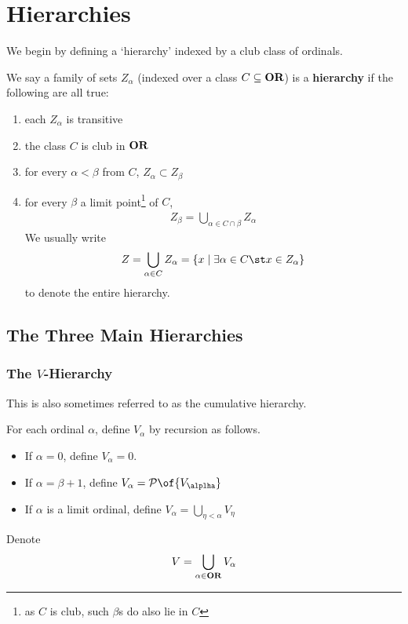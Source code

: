 \chapter{Hierarchies}

We begin by defining a `hierarchy' indexed by a club class of ordinals.

\begin{definition}[Hierarchy]
  We say a family of sets $Z_{\alpha}$ (indexed over a class $C \subseteq \mathbf{OR}$) is a \textbf{hierarchy} if the following are all true:
  \begin{enumerate}
    \item each $Z_{\alpha}$ is transitive
    \item the class $C$ is club in $\mathbf{OR}$
    \item for every $\alpha < \beta$ from $C$, $Z_{\alpha} \subset Z_{\beta}$
      \item for every $\beta$ a limit point\footnote{as $C$ is club, such $\beta$s do also lie in $C$} of $C$,
      \begin{align*}
          Z_{\beta} = \bigcup_{\alpha \in C \cap \beta} Z_{\alpha}
      \end{align*}
    We usually write
    \begin{align*}
        Z = \bigcup_{\alpha \in C} Z_{\alpha}
        = \setst{x}{\exists \alpha \in C \st x \in Z_{\alpha}}
    \end{align*}
    to denote the entire hierarchy.
  \end{enumerate}
\end{definition}

\section{The Three Main Hierarchies}

\subsection{The $V$-Hierarchy}

This is also sometimes referred to as the cumulative hierarchy.

\begin{definition}
  For each ordinal $\alpha$, define $V_{\alpha}$ by recursion as follows.
  \begin{itemize}
    \item If $\alpha = 0$, define $V_{\alpha} = 0$.
    \item If $\alpha = \beta + 1$, define $V_{\alpha} = \Powset\of{V_{\alplha}}$
    \item If $\alpha$ is a limit ordinal, define $V_{\alpha} = \bigcup_{\eta < \alpha} V_{\eta}$
  \end{itemize}
  Denote
  \begin{align*}
    V = \bigcup_{\alpha \in \mathbf{OR}} V_{\alpha}
  \end{align*}
\end{definition}

